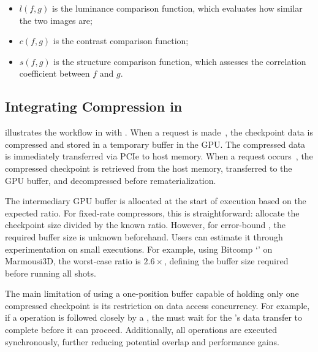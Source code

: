 \documentclass[Ingles,Final]{ic-tese-v3}
\begin{document}
\begin{itemize}
    \item $l(f, g)$ is the luminance comparison function, which evaluates how similar the two images are;
    \item $c(f, g)$ is the contrast comparison function;
    \item $s(f, g)$ is the structure comparison function, which assesses the correlation coefficient between $f$ and $g$.
\end{itemize}



\subsection{Integrating Compression in \awave}
\label{sec:comp_awave}
 illustrates the \checkpointing workflow in \awave with \compression. When a \save request is made~, the checkpoint data is compressed and stored in a temporary buffer in the GPU. The compressed data is immediately transferred via PCIe to host memory. When a \restore request occurs~, the compressed checkpoint is retrieved from the host memory, transferred to the GPU buffer, and decompressed before rematerialization.

The intermediary GPU buffer is allocated at the start of execution based on the expected \compression ratio. For fixed-rate compressors, this is straightforward: allocate the checkpoint size divided by the known \compression ratio. However, for error-bound \compression, the required buffer size is unknown beforehand. Users can estimate it through experimentation on small executions. For example, using Bitcomp `' on Marmousi3D, the worst-case \compression ratio is $2.6\times$, defining the buffer size required before running all shots.

The main limitation of using a one-position buffer capable of holding only one compressed checkpoint is its restriction on data access concurrency. For example, if a \save operation is followed closely by a \restore, the \restore must wait for the \save's data transfer to complete before it can proceed. Additionally, all \restore operations are executed synchronously, further reducing potential overlap and performance gains.
\end{document}
